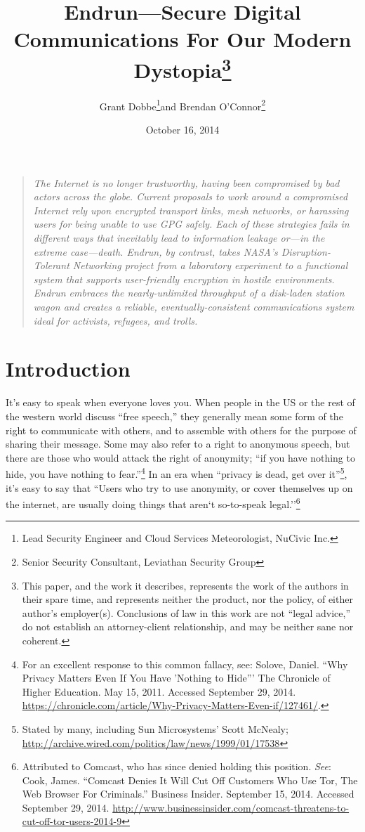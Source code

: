\documentclass[12pt]{article}
\title{Endrun---Secure Digital Communications For Our Modern Dystopia\footnote{This paper, and the work it describes, represents the work of the authors in their spare time, and represents neither the product, nor the policy, of either author's employer(s). Conclusions of law in this work are not ``legal advice,'' do not establish an attorney-client relationship, and may be neither sane nor coherent.}}
\author{Grant Dobbe\footnote{Lead Security Engineer and Cloud Services Meteorologist, NuCivic Inc.}\space\space and Brendan O'Connor\footnote{Senior Security Consultant, Leviathan Security Group}}
\date{October 16, 2014}
\begin{document}
	
	\maketitle
  
  \begin{quote}
    \emph{The Internet is no longer trustworthy, having been compromised by bad actors across the globe. Current proposals to work around a compromised Internet rely upon encrypted transport links, mesh networks, or harassing users for being unable to use GPG safely. Each of these strategies fails in different ways that inevitably lead to information leakage or---in the extreme case---death. Endrun, by contrast, takes NASA's Disruption-Tolerant Networking project from a laboratory experiment to a functional system that supports user-friendly encryption in hostile environments. Endrun embraces the nearly-unlimited throughput of a disk-laden station wagon and creates a reliable, eventually-consistent communications system ideal for activists, refugees, and trolls.}
    \end{quote}
	
	\section{Introduction}
	
  It's easy to speak when everyone loves you. When people in the US or the rest of the western world discuss ``free speech,'' they generally mean some form of the right to communicate with others, and to assemble with others for the purpose of sharing their message. Some may also refer to a right to anonymous speech, but there are those who would attack the right of anonymity; ``if you have nothing to hide, you have nothing to fear.''\footnote{For an excellent response to this common fallacy, see: Solove, Daniel. ``Why Privacy Matters Even If You Have 'Nothing to Hide''' The Chronicle of Higher Education. May 15, 2011. Accessed September 29, 2014. \url{https://chronicle.com/article/Why-Privacy-Matters-Even-if/127461/}.} In an era when ``privacy is dead, get over it''\footnote{Stated by many, including Sun Microsystems' Scott McNealy; \url{http://archive.wired.com/politics/law/news/1999/01/17538}}, it's easy to say that ``Users who try to use anonymity, or cover themselves up on the internet, are usually doing things that aren`t so-to-speak legal.''\footnote{Attributed to Comcast, who has since denied holding this position. \emph{See}: Cook, James. ``Comcast Denies It Will Cut Off Customers Who Use Tor, The Web Browser For Criminals.'' Business Insider. September 15, 2014. Accessed September 29, 2014. \url{http://www.businessinsider.com/comcast-threatens-to-cut-off-tor-users-2014-9}}
  
\end{document}
